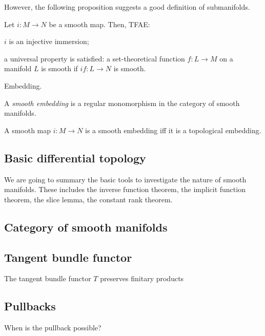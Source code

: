 \documentclass{../exp}
\begin{document}
However, the following proposition suggests a good definition of submanifolds.
\begin{prop}
Let $i:M\to N$ be a smooth map.
Then, TFAE:
\begin{cond}
\item $i$ is an injective immersion;
\item a universal property is satisfied: a set-theoretical function $f:L\to M$ on a manifold $L$ is smooth if $if:L\to N$ is smooth.
\end{cond}
\end{prop}


Embedding.

\begin{defn}
A \emph{smooth embedding} is a regular monomorphism in the category of smooth manifolds.
\end{defn}
\begin{prop}
A smooth map $i:M\to N$ is a smooth embedding iff it is a topological embedding.
\end{prop}










\subsection{Basic differential topology}
We are going to summary the basic tools to investigate the nature of smooth manifolds.
These includes the inverse function theorem, the implicit function theorem, the slice lemma, the constant rank theorem.

\subsection{Category of smooth manifolds}


\subsection{Tangent bundle functor}

\begin{thm}
The tangent bundle functor $T$ preserves finitary products
\end{thm}


\subsection{Pullbacks}
When is the pullback possible?
\end{document}
